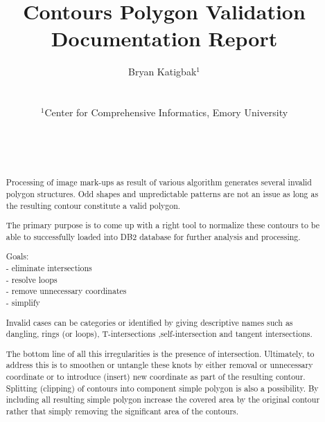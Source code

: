 \documentclass{sig-alternate}
\begin{document}
\title{Contours Polygon Validation \\
       Documentation Report}


\author{
Bryan Katigbak$^{1}$\\
\\
\begin{tabular}{c}
$^1$Center for Comprehensive Informatics, Emory University \\
\end{tabular}
\\
\\
\\
}

\maketitle
\begin{abstract}
Processing of image mark-ups as result of various algorithm generates several invalid polygon structures. Odd shapes and unpredictable patterns are not an issue as long as the resulting contour constitute a valid polygon.

The primary purpose is to come up with a right tool to normalize these contours to be able to successfully loaded into DB2 database for further analysis and processing.

Goals:\\
  - eliminate intersections\\
  - resolve loops\\
  - remove unnecessary coordinates\\
  - simplify

Invalid cases can be categories or identified by giving descriptive names such as dangling, rings (or loops), T-intersections ,self-intersection and tangent intersections.

The bottom line of all this irregularities is the presence of intersection. Ultimately, to address this is to smoothen or untangle these knots by either removal or unnecessary coordinate or to introduce (insert) new coordinate as part of the resulting contour. Splitting (clipping) of contours into component simple polygon is also a possibility. By including all resulting simple polygon increase the covered area by the original contour rather that simply removing the significant area of the contours.

\end{abstract}
\end{document}
